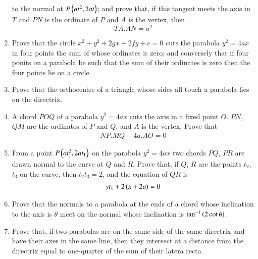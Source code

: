 \begin{enumerate}[1.]
to the normal at $P \left(at^2,2at\right)$; and prove that, if this tangent meets the axis in $T$
and $PN$ is the ordinate of $P$ and $A$ is the vertex, then
\begin{equation*}
TA.AN=a^2
\end{equation*}
\item Prove that the circle $x^2+y^2+2gx+2fy+c=0$ cuts the parabola $y^2=4ax$ in four points the sum of
whose ordinates is zero; and conversely that if four ponits on a parabola be
such that the sum of their ordinates is zero then the four points lie on a circle.
\item Prove that the orthocentre of a triangle whose sides all touch a parabola
lies on the directrix.
\item A chord $POQ$ of a parabola $y^2=4ax$ cuts the axis in a fixed point $O$.  $PN$, $QM$ are the ordinates of $P$ and $Q$,
and $A$ is the vertex.  Prove that
\begin{align*}
NP.MQ+4a.AO=0
\end{align*}
\item From a point $P \left(at_1^2,2at_1\right)$ on the parabola $y^2=4ax$ two chords $PQ$, $PR$ are drawn normal to the curve at $Q$
and $R$.  Prove that, if $Q$, $R$ are the points $t_2$, $t_3$ on the curve, then $t_2t_3=2$, and the equation
of $QR$ is
\begin{align*}
yt_1+2\left(x+2a\right) = 0
\end{align*}
\item Prove that the normals to a parabola at the ends of a chord whose inclination to the axis is $\theta$ meet on the
normal whose inclination is $\tan^{-1}\left(2\cot\theta\right)$.
\item Prove that, if two parabolas are on the same side of the same directrix and have their axes in the same line, then they intersect
at a distance from the directrix equal to one-quarter of the sum of their latera recta.

\end{enumerate}
